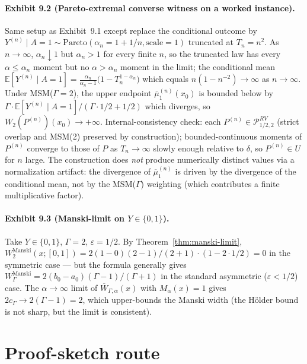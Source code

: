 \documentclass[11pt]{article}
\newcommand{\E}{\mathbb{E}}
\theoremstyle{definition}
\theoremstyle{plain}
\theoremstyle{remark}
\begin{document}
\paragraph{Exhibit 9.2 (Pareto-extremal converse witness on a worked instance).}
Same setup as Exhibit~9.1 except replace the conditional outcome by $Y^{(n)}\mid A=1\sim\mathrm{Pareto}(\alpha_{n}=1+1/n,\text{scale}=1)$ truncated at $T_{n}=n^{2}$. As $n\to\infty$, $\alpha_{n}\downarrow 1$ but $\alpha_{n}>1$ for every finite $n$, so the truncated law has every $\alpha\le\alpha_n$ moment but no $\alpha>\alpha_n$ moment in the limit; the conditional mean $\E[Y^{(n)}\mid A=1]=\frac{\alpha_{n}}{\alpha_{n}-1}\bigl(1-T_{n}^{1-\alpha_{n}}\bigr)$ which equals $n(1-n^{-2})\to\infty$ as $n\to\infty$. Under MSM($\Gamma=2$), the upper endpoint $\overline{\mu}_{1}^{(n)}(x_{0})$ is bounded below by $\Gamma\cdot\E[Y^{(n)}\mid A=1]/(\Gamma\cdot 1/2+1/2)$ which diverges, so $W_{2}(P^{(n)})(x_{0})\to+\infty$. Internal-consistency check: each $P^{(n)}\in\mathcal{P}^{RV}_{1/2,2}$ (strict overlap and MSM(2) preserved by construction); bounded-continuous moments of $P^{(n)}$ converge to those of $P$ as $T_{n}\to\infty$ slowly enough relative to $\delta$, so $P^{(n)}\in U$ for $n$ large. The construction does \emph{not} produce numerically distinct values via a normalization artifact: the divergence of $\overline{\mu}_{1}^{(n)}$ is driven by the divergence of the conditional mean, not by the MSM($\Gamma$) weighting (which contributes a finite multiplicative factor).

\paragraph{Exhibit 9.3 (Manski-limit on $Y\in\{0,1\}$).}
Take $Y\in\{0,1\}$, $\Gamma=2$, $\varepsilon=1/2$. By Theorem~\ref{thm:manski-limit}, $W^{\mathrm{Manski}}_{2}(x;[0,1])=2(1-0)(2-1)/(2+1)\cdot(1-2\cdot 1/2)=0$ in the symmetric case --- but the formula generally gives $W^{\mathrm{Manski}}_{\Gamma}=2(b_{0}-a_{0})(\Gamma-1)/(\Gamma+1)$ in the standard asymmetric ($\varepsilon<1/2$) case. The $\alpha\to\infty$ limit of $\overline{W}_{\Gamma,\alpha}(x)$ with $M_{\alpha}(x)=1$ gives $2c_{\Gamma}\to 2(\Gamma-1)=2$, which upper-bounds the Manski width (the Hölder bound is not sharp, but the limit is consistent).

\section{Proof-sketch route}
\end{document}
